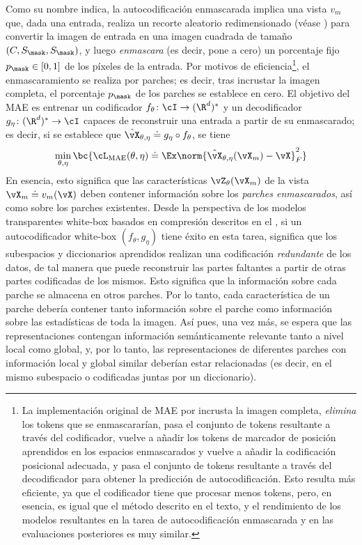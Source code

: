 \documentclass[../../book-main_es.tex]{subfiles}
\begin{document}
Como su nombre indica, la autocodificación enmascarada implica una vista \(v_{m}\)
que, dada una entrada, realiza un recorte aleatorio redimensionado (véase
) para convertir la imagen de entrada
en una imagen cuadrada de tamaño \((C, S_{\mask}, S_{\mask})\), y luego
\textit{enmascara} (es decir, pone a cero) un porcentaje fijo \(p_{\mask}
\in [0, 1]\) de los píxeles de la entrada. Por motivos de eficiencia\footnote {La implementación original de MAE por
\cite{he2022masked} incrusta la imagen completa, \textit{elimina} los
tokens que se enmascararían, pasa el conjunto de tokens resultante a través
del codificador, vuelve a añadir los tokens de marcador de posición aprendidos en los espacios enmascarados
y vuelve a añadir la codificación posicional adecuada, y pasa el
conjunto de tokens resultante a través del decodificador para obtener la predicción de autocodificación.
Esto resulta más eficiente, ya que el codificador tiene que procesar menos tokens,
pero, en esencia, es igual que el método descrito
en el texto, y el rendimiento de los modelos resultantes en la tarea de autocodificación enmascarada
y en las evaluaciones posteriores es muy similar.}, el
enmascaramiento se realiza por parches; es decir, tras incrustar la imagen completa,
el porcentaje \(p_{\mask}\) de los parches se establece en cero.  El
objetivo del MAE es entrenar un codificador \(f_{\theta} \colon \cI \to
(\R^{d})^{*}\) y un decodificador \(g_{\eta} \colon (\R^{d})^{*} \to \cI\)
capaces de reconstruir una entrada a partir de su enmascarado; es decir, si se establece que
\(\hat{\vX}_{\theta, \eta} \doteq g_{\eta} \circ f_{\theta}\), se tiene
\begin{equation}
\min_{\theta, \eta}\bc{\cL_{\mathrm{MAE}}(\theta, \eta) \doteq
\Ex\norm{\hat{\vX}_{\theta, \eta}(\vX_{m}) - \vX}_{F}^{2}}
\end{equation}
En esencia, esto significa que las características \(\vZ_{\theta}(\vX_{m})\) de
la vista \(\vX_{m} \doteq v_{m}(\vX)\) deben contener información sobre
los \textit{parches enmascarados}, así como sobre los parches existentes. Desde la
perspectiva de los modelos transparentes white-box basados en compresión descritos en el
, si un autocodificador white-box  \((f_{\theta},
g_{\eta})\) tiene éxito en esta tarea, significa que los
subespacios y diccionarios aprendidos realizan una codificación \textit{redundante} de 
los datos, de tal manera que puede reconstruir las partes faltantes a partir de
otras partes codificadas de los mismos. Esto significa que la información sobre
cada parche se almacena en otros parches. Por lo tanto, cada característica de un parche
debería contener tanto información sobre el parche como información sobre
las estadísticas de toda la imagen. Así pues, una vez más, se espera que las
representaciones contengan información semánticamente relevante tanto a nivel local como global,
y, por lo tanto, las representaciones de diferentes
parches con información local y global similar deberían estar relacionadas
(es decir, en el mismo subespacio o codificadas juntas por un diccionario).
\end{document}
